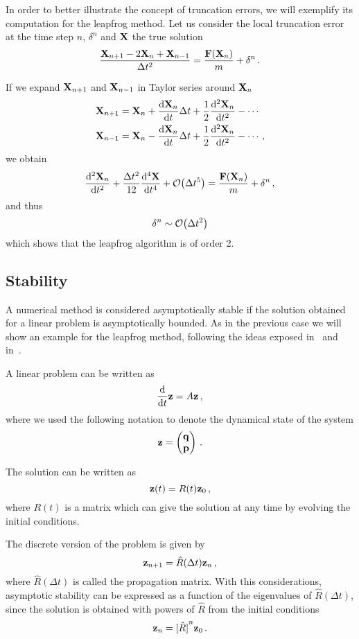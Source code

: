 \documentclass[12pt, class=report, crop=false]{standalone}
\begin{document}
In order to better illustrate the concept of truncation errors, we will exemplify
its computation for the leapfrog method. Let us consider the local truncation
error at the time step \(n\), \(\delta^n\) and \(\vb{X}\) the true solution
\[
  \frac{\vb{X}_{n+1}-2\vb{X}_n+\vb{X}_{n-1}}{\Delta t^2} = \frac{\vb{F}(\vb{X}_n)}{m} + \delta^n\,.
\]

If we expand \(\vb{X}_{n+1}\) and \(\vb{X}_{n-1}\) in Taylor series around \(\vb{X}_n\)
\begin{align*}
  \vb{X}_{n+1} &= \vb{X}_n + \dv{\vb{X}_n}{t}\Delta t + \frac{1}{2} \dv[2]{\vb{X}_n}{t} - \dotsb \\
  \vb{X}_{n-1} &= \vb{X}_n - \dv{\vb{X}_n}{t}\Delta t + \frac{1}{2} \dv[2]{\vb{X}_n}{t} - \dotsb\,,
\end{align*}
we obtain
\[
  \dv[2]{\vb{X}_n}{t} + \frac{\Delta t^2}{12} \dv[4]{\vb{X}}{t} + \order{\Delta t^5}
  = \frac{\vb{F}(\vb{X}_n)}{m} + \delta^n\,,
\]
and thus
\[
  \delta^n \sim \order{\Delta t^2}
\]
which shows that the leapfrog algorithm is of order 2.

\subsection{Stability}

A numerical method is considered asymptotically stable if the solution obtained
for a linear problem is asymptotically bounded.
As in the previous case we will show an example for the leapfrog method,
following the ideas exposed in~\cite{butcher_numericalmethods_2016}
and in~\textcite[Section 2.6]{leimkuhler_simulatinghamiltonian_2004}.

A linear problem can be written as
\[
\dv{t} \vb{z} = A \vb{z}\,,
\]
where we used the following notation to denote the dynamical state of the system
\[
\vb{z} =
\begin{pmatrix}
  \vb{q} \\
  \vb{p}
\end{pmatrix}\,.
\]

The solution can be written as
\begin{equation*}
  \vb{z}(t) = R(t) \vb{z}_0\,,
\end{equation*}
where \(R(t)\) is a matrix which can give the solution at any time by evolving
the initial conditions.

The discrete version of the problem is given by
\begin{equation}
  \label{eq:discrete-linear-problem}
  \vb{z}_{n+1} = \hat{R}(\Delta t) \vb{z}_n\,,
\end{equation}
where \(\hat{R}(\Delta t)\) is called the propagation matrix.
With this considerations, asymptotic stability can be expressed as a function
of the eigenvalues of \(\hat{R}(\Delta t)\), since the solution is obtained
with powers of \(\hat{R}\) from the initial conditions
\begin{equation*}
  \vb{z}_n = {[\hat{R}]}^n \vb{z}_0\,.
\end{equation*}
\end{document}
